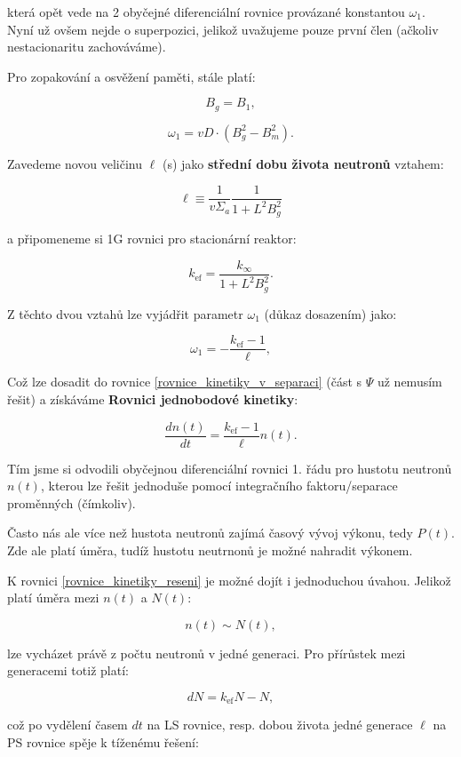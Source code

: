 která opět vede na 2 obyčejné diferenciální rovnice provázané konstantou $\omega_1$. Nyní už ovšem nejde o superpozici, jelikož uvažujeme pouze první člen (ačkoliv nestacionaritu zachováváme).

Pro zopakování a osvěžení paměti, stále platí:

$$ B_g = B_1, $$

$$ \omega_1 = vD \cdot (B_g^2 - B_m^2). $$

Zavedeme novou veličinu $\ell$ (s) jako \textbf{střední dobu života neutronů} vztahem:

\begin{equation}
  \boxed{
  \ell \equiv \dfrac{1}{v \Sigma_a} \dfrac{1}{1+L^2B_g^2}
  \label{stredni_doba_zivota}}
\end{equation}

a připomeneme si 1G rovnici pro stacionární reaktor:

$$ k_{\text{ef}} = \dfrac{k_{\infty}}{1 + L^2 B_g^2}. $$

Z těchto dvou vztahů lze vyjádřit parametr $\omega_1$ (důkaz dosazením) jako:

$$ \omega_1 = -\dfrac{k_{\text{ef}} - 1}{\ell}, $$

Což lze dosadit do rovnice \eqref{rovnice_kinetiky_v_separaci} (část s $\Psi$ už nemusím řešit) a získáváme \textbf{Rovnici jednobodové kinetiky}:

\begin{equation}
  \boxed{
  \dfrac{dn(t)}{dt} = \dfrac{k_{\text{ef}} - 1}{\ell} n(t).
  \label{rovnice_kinetiky_reseni}}
\end{equation}

Tím jsme si odvodili obyčejnou diferenciální rovnici 1. řádu pro hustotu neutronů $n(t)$, kterou lze řešit jednoduše pomocí integračního faktoru/separace proměnných (čímkoliv).

Často nás ale více než hustota neutronů zajímá časový vývoj výkonu, tedy $P(t)$. Zde ale platí úměra, tudíž hustotu neutrnonů je možné nahradit výkonem.

K rovnici \eqref{rovnice_kinetiky_reseni} je možné dojít i jednoduchou úvahou. Jelikož platí úměra mezi $n(t)$ a $N(t)$:

$$ n(t) \sim N(t), $$

lze vycházet právě z počtu neutronů v jedné generaci. Pro přírůstek mezi generacemi totiž platí:

$$ dN = k_{\text{ef}}N - N, $$

což po vydělení časem $dt$ na LS rovnice, resp. dobou života jedné generace $\ell$ na PS rovnice spěje k tíženému řešení:

